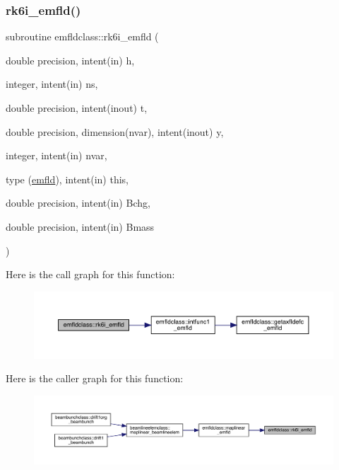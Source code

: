 \subsubsection{\texorpdfstring{rk6i\_emfld()}{rk6i\_emfld()}}
{\footnotesize\ttfamily subroutine emfldclass\+::rk6i\+\_\+emfld (\begin{DoxyParamCaption}\item[{double precision, intent(in)}]{h,  }\item[{integer, intent(in)}]{ns,  }\item[{double precision, intent(inout)}]{t,  }\item[{double precision, dimension(nvar), intent(inout)}]{y,  }\item[{integer, intent(in)}]{nvar,  }\item[{type (\mbox{\hyperlink{namespaceemfldclass_structemfldclass_1_1emfld}{emfld}}), intent(in)}]{this,  }\item[{double precision, intent(in)}]{Bchg,  }\item[{double precision, intent(in)}]{Bmass }\end{DoxyParamCaption})}

Here is the call graph for this function\+:\nopagebreak
\begin{figure}[H]
\begin{center}
\leavevmode
\includegraphics[width=350pt]{namespaceemfldclass_ae4bfa1325df7cec4a3facbe8ebc66845_cgraph}
\end{center}
\end{figure}
Here is the caller graph for this function\+:\nopagebreak
\begin{figure}[H]
\begin{center}
\leavevmode
\includegraphics[width=350pt]{namespaceemfldclass_ae4bfa1325df7cec4a3facbe8ebc66845_icgraph}
\end{center}
\end{figure}
\mbox{\label{namespaceemfldclass_a89c21ffdad41e63e575b3bc21899f600}} 
